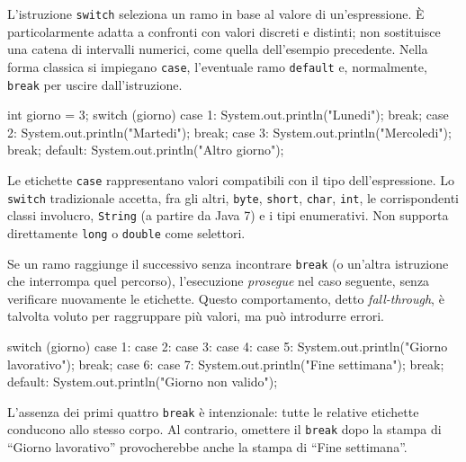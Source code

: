 L'istruzione \texttt{switch} seleziona un ramo in base al valore di
un'espressione. È particolarmente adatta a confronti con valori
discreti e distinti; non sostituisce una catena di intervalli
numerici, come quella dell'esempio precedente. Nella forma classica
si impiegano \texttt{case}, l'eventuale ramo \texttt{default} e,
normalmente, \texttt{break} per uscire dall'istruzione.

\begin{unipdcode}[language=Java]
int giorno = 3;
switch (giorno) {
    case 1:
        System.out.println("Lunedi");
        break;
    case 2:
        System.out.println("Martedi");
        break;
    case 3:
        System.out.println("Mercoledi");
        break;
    default:
        System.out.println("Altro giorno");
}
\end{unipdcode}

Le etichette \texttt{case} rappresentano valori compatibili con il
tipo dell'espressione. Lo \texttt{switch} tradizionale accetta, fra
gli altri, \texttt{byte}, \texttt{short}, \texttt{char},
\texttt{int}, le corrispondenti classi involucro, \texttt{String}
(a partire da Java 7) e i tipi enumerativi. Non supporta direttamente
\texttt{long} o \texttt{double} come selettori.

\begin{warning}
Se un ramo raggiunge il successivo senza incontrare \texttt{break}
(o un'altra istruzione che interrompa quel percorso), l'esecuzione
\emph{prosegue} nel caso seguente, senza verificare nuovamente le
etichette. Questo comportamento, detto \emph{fall-through}, è talvolta
voluto per raggruppare più valori, ma può introdurre errori.
\end{warning}

\begin{unipdcode}[language=Java]
switch (giorno) {
    case 1:
    case 2:
    case 3:
    case 4:
    case 5:
        System.out.println("Giorno lavorativo");
        break;
    case 6:
    case 7:
        System.out.println("Fine settimana");
        break;
    default:
        System.out.println("Giorno non valido");
}
\end{unipdcode}

L'assenza dei primi quattro \texttt{break} è intenzionale: tutte
le relative etichette conducono allo stesso corpo. Al contrario,
omettere il \texttt{break} dopo la stampa di ``Giorno lavorativo''
provocherebbe anche la stampa di ``Fine settimana''.

\clearpage

